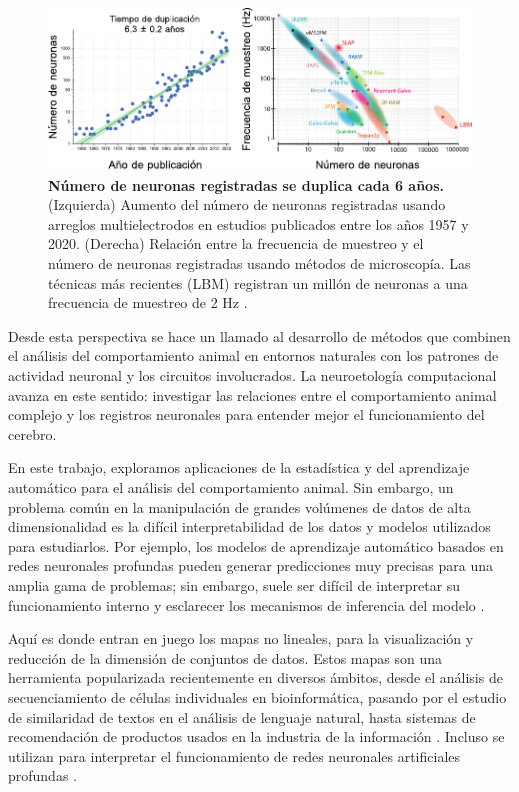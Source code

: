 \begin{figure}[htbp]
  \centering
  \includegraphics[width=0.99\linewidth]{figuras/introduccion/registros_neuronas.pdf}
  \caption{\textbf{Número de neuronas registradas se duplica cada 6 años.} (Izquierda) Aumento del número de neuronas registradas usando arreglos multielectrodos en estudios publicados entre los años 1957 y 2020. (Derecha) Relación entre la frecuencia de muestreo y el número de neuronas registradas usando métodos de microscopía. Las técnicas más recientes (LBM) registran un millón de neuronas a una frecuencia de muestreo de 2 Hz \cite{neuron_recording_duplication, lecoq_neuron_microscopy, demas_lbm, chen_neuron_recording_scales}.}
  \label{fig:introduccion_registros_neuronas}
\end{figure}

Desde esta perspectiva se hace un llamado al desarrollo de métodos que combinen el análisis del comportamiento animal en entornos naturales con los patrones de actividad neuronal y los circuitos involucrados. La neuroetología computacional avanza en este sentido: investigar las relaciones entre el comportamiento animal complejo y los registros neuronales para entender mejor el funcionamiento del cerebro.

En este trabajo, exploramos aplicaciones de la estadística y del aprendizaje automático para el análisis del comportamiento animal. Sin embargo, un problema común en la manipulación de grandes volúmenes de datos de alta dimensionalidad es la difícil interpretabilidad de los datos y modelos utilizados para estudiarlos. Por ejemplo, los modelos de aprendizaje automático basados en redes neuronales profundas pueden generar predicciones muy precisas para una amplia gama de problemas; sin embargo, suele ser difícil de interpretar su funcionamiento interno y esclarecer los mecanismos de inferencia del modelo \cite{molnar_interpretable_machine_learning}.

Aquí es donde entran en juego los mapas no lineales, para la visualización y reducción de la dimensión de conjuntos de datos. Estos mapas son una herramienta popularizada recientemente en diversos ámbitos, desde el análisis de secuenciamiento de células individuales en bioinformática, pasando por el estudio de similaridad de textos en el análisis de lenguaje natural, hasta sistemas de recomendación de productos usados en la industria de la información \cite{packer_umap_c_elegans, mikolov_word2vec, recommendation_systems}. Incluso se utilizan para interpretar el funcionamiento de redes neuronales artificiales profundas \cite{carter_activation_atlas}.

